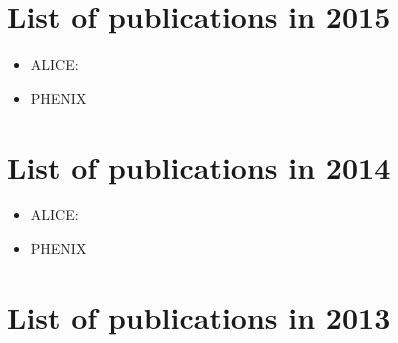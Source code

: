 \documentclass[12pt]{article}
\begin{document}
\clearpage

\section{List of publications in 2015}

\begin{itemize}
\item ALICE:
\cite{
Adam:2015pna,
Adam:2015rba,
Adam:2015qaa,
Adam:2015iga,
Adam:2015xea,
Adam:2015hoa,
Adam:2015ewa,
Adam:2015pya,
Adam:2015mya,
Adam:2014qja,
ALICE:2014rma,
ALICE:2014dla,
Abelev:2014oea,
Abelev:2014mva,
Abelev:2014qqa,
Abelev:2014pua,
Abelev:2014gla}

\item PHENIX
\cite{
Adare:2014wht,
Adare:2014mgk,
Adare:2014iwg,
Adare:2014fwh,
Adare:2014rly,
Adare:2014keg,
Adare:2014hje}


\end{itemize}

\section{List of publications in 2014}

\begin{itemize}
\item ALICE:
\cite{
Abelev:2014ckr,
Abelevetal:2014dna,
Abelevetal:2014cna,
TheALICE:2014dwa,
Abelev:2014mda,
Abelev:2014nua,
Abelev:2014hla,
Abelev:2014zpa,
Abelev:2014ypa,
Abelev:2014hha,
Abelev:2014dsa,
Abelev:2014ipa,
Abelev:2014epa,
Abelev:2014pja,
Abelev:2014qha,
Abelev:2014ffa,
Abelev:2014laa,
Abelev:2013kqa,
Abelev:2013ila,
Abelev:2013pqa,
Abelev:2013yxa,
Abelev:2013haa,
ABELEV:2013zaa}


\item PHENIX
\cite{
Adare:2014qzo,
Adare:2014mgt,
Adare:2014eyu,
Adare:2014vri,
Aidala:2014bqx,
Adare:2014hsq,
Adare:2014vax,
Adler:2013aqf,
Adare:2013ekj,
Adare:2013xlp,
Adare:2013yxp,
Adare:2013nff,
Adare:2013lkk}


\end{itemize}


\section{List of publications in 2013}
\end{document}
